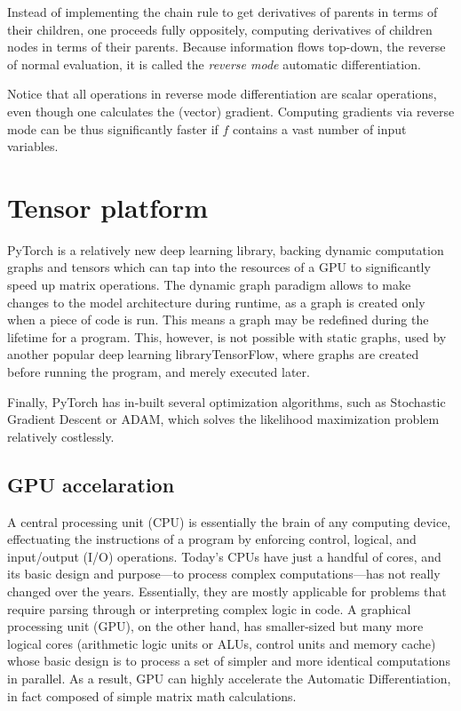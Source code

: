 \documentclass{pracamgr}
\numberwithin{equation}{section}
\begin{document}
Instead of implementing the chain rule to get derivatives of parents in terms of their children, one proceeds fully oppositely, computing derivatives of children nodes in terms of their parents. Because information flows top-down, the reverse of normal evaluation, it is called the \textit{reverse mode} automatic differentiation.

Notice that  all operations in reverse mode differentiation are scalar operations, even though one calculates the (vector) gradient. Computing gradients via reverse mode can be thus significantly faster if $f$ contains a vast number of input variables.

\section{Tensor platform}

PyTorch is a relatively new deep learning library, backing dynamic computation graphs and tensors which can tap into the resources of a GPU to significantly speed up matrix operations. The dynamic graph paradigm allows to make changes to the model architecture during runtime, as a graph is created only when a piece of code is run. This means a graph may be redefined during the lifetime for a program. This, however, is not possible with static graphs, used by another popular deep learning libraryTensorFlow, where graphs are created before running the program, and merely executed later. 

Finally, PyTorch has in-built several optimization algorithms, such as Stochastic Gradient Descent or ADAM, which solves the likelihood maximization problem relatively costlessly.

\subsection{GPU accelaration}

A central processing unit (CPU) is essentially the brain of any computing device, effectuating the instructions of a program by enforcing control, logical, and input/output (I/O) operations. Today’s CPUs have just a handful of cores, and its basic design and purpose—to process complex computations—has not really changed over the years. Essentially, they are mostly applicable for problems that require parsing through or interpreting complex logic in code. A graphical processing unit (GPU), on the other hand, has smaller-sized but many more logical cores (arithmetic logic units or ALUs, control units and memory cache) whose basic design is to process a set of simpler and more identical computations in parallel. As a result, GPU can highly accelerate the Automatic Differentiation, in fact composed of simple matrix math calculations. 
\end{document}
